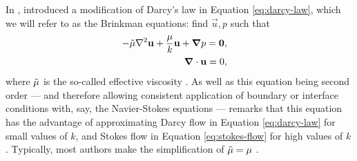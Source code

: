         In \citeyear{brinkmanCalculationViscousForce1949}, \citeauthor{brinkmanCalculationViscousForce1949} \cite{brinkmanCalculationViscousForce1949} introduced a modification of Darcy's law in Equation \eqref{eq:darcy-law}, which we will refer to as the Brinkman equations: find $\vec{u}, p$ such that
        \begin{subequations}
            \begin{align}
                \begin{split}
                    - \Tilde{\mu} \nabla^2 \vec{u} + \frac{\mu}{k} \vec{u} + \vec{\nabla} p & = \vec{0},
                \end{split}\\
                \begin{split}
                    \vec{\nabla} \cdot \vec{u} & = 0,
                \end{split}%
            \end{align}%
            \label{eq:brinkman}%
        \end{subequations}%
        where $\Tilde{\mu}$ is the so-called effective viscosity \cite{nieldConvectionPorousMedia2017}. As well as this equation being second order --- and therefore allowing consistent application of boundary or interface conditions with, say, the Navier-Stokes equations --- \citeauthor{brinkmanCalculationViscousForce1949} remarks that this equation has the advantage of approximating Darcy flow in Equation \eqref{eq:darcy-law} for small values of $k$, and Stokes flow in Equation \eqref{eq:stokes-flow} for high values of $k$. Typically, most authors make the simplification of $\Tilde{\mu} = \mu$ \cite{auriaultDomainValidityBrinkman2009}.

